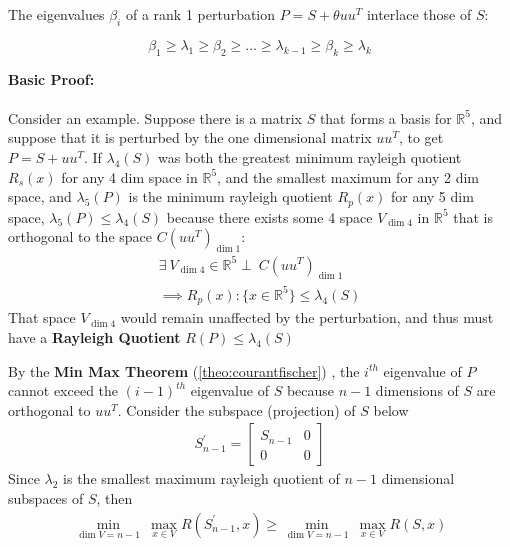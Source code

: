 \documentclass{article}
\newcommand{\myparbox}{\parbox[p]{10cm}}
\newcommand{\minmax}[2]{\min\limits_{#1}~\max\limits_{#2}}
\newenvironment{note}{
  \begin{flushleft}
  \begin{addmargin}[2em]{2em}
}{
  \end{addmargin}
  \end{flushleft}
}
\newcommand*{\reftheo}[1]{%
  \begingroup
    \hypersetup{
      linkcolor=linktheo,
      linkbordercolor=linktheo,
    }%
    (\ref{#1})%
  \endgroup
}
\begin{document}
\begin{note}
  \myparbox{
    The eigenvalues $\beta_i$ of a rank 1 perturbation $P=S+\theta uu^T$
    interlace those of $S$:
  }
  \begin{equation}
    \beta_1\geq\lambda_1\geq\beta_{2}\geq...\geq\lambda_{k-1}\geq\beta_k\geq\lambda_k
  \end{equation}
  \myparbox{
    \textbf{Basic Proof:}\\ \\
    Consider an example.  Suppose there is a matrix $S$ that forms a basis for
    $\mathbb{R}^5$, and suppose that it is perturbed by the one dimensional
    matrix $uu^T$, to get $P=S+uu^T$.  If $\lambda_4(S)$ was both the greatest
    minimum rayleigh quotient $R_s(x)$ for any 4 dim space in $\mathbb{R}^5$, and
    the smallest maximum for any 2 dim space, and $\lambda_5(P)$ is the minimum
    rayleigh quotient $R_p(x)$ for any 5 dim space, $\lambda_5(P)\leq \lambda_4(S)$
    because there exists some 4 space $V_{\dim{4}}$ in $\mathbb{R}^5$ that is
    orthogonal to the space $C(uu^T)_{\dim{1}}$:\newline
    \begin{align}
      \exists~V_{\dim{4}} \in \mathbb{R}^5\perp~C(uu^T)_{\dim{1}}\\
      \implies R_p(x):\{x\in \mathbb{R}^5\}\leq\lambda_4(S)
    \end{align}
    That space $V_{\dim{4}}$ would remain unaffected by the perturbation, and thus
    must have a \textbf{Rayleigh Quotient} $R(P)\leq\lambda_4(S)$
    \\
  }
  \newline
  \newline
  By the \textbf{Min Max Theorem} \reftheo{theo:courantfischer}, the $i^{th}$ eigenvalue of $P$ cannot exceed
  the $(i-1)^{th}$ eigenvalue of $S$ because $n-1$ dimensions of $S$ are
  orthogonal to $uu^T$.  Consider the subspace (projection) of $S$ below
  \begin{align*}
    S_{n-1}^{\prime}=\begin{bmatrix}
      S_{n-1} & 0 \\
      0       & 0
    \end{bmatrix}
  \end{align*}
  Since $\lambda_2$ is the smallest maximum rayleigh quotient of $n-1$
  dimensional subspaces of $S$, then
  \begin{align}
    \minmax{\dim V=n-1}{x\in V}R(S^\prime_{n-1},x) \geq \minmax{\dim V=n-1}{x\in V} R(S,x)
  \end{align}

\end{note}
\end{document}
